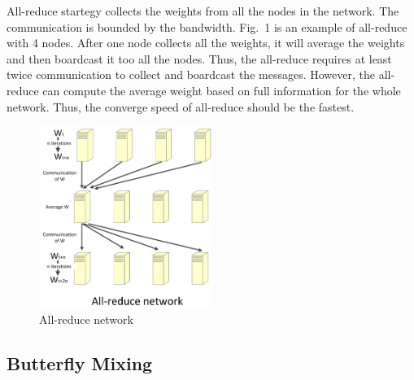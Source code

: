 \documentclass{article}
\begin{document}
All-reduce startegy collects the weights from all the nodes in the network. The communication is bounded by the bandwidth. Fig.~1 is an example of all-reduce with 4 nodes. After one node collects all the weights, it will average the weights and then boardcast it too all the nodes. Thus, the all-reduce requires at least twice communication to collect and boardcast the messages. However, the all-reduce can compute the average weight based on full information for the whole network. Thus, the converge speed of all-reduce should be the fastest.
\begin{figure}[h!]
  
  \centering
    \includegraphics[width=0.5\textwidth]{allreduce.jpg}
    \caption{All-reduce network}
\end{figure}
\subsection{Butterfly Mixing}
 
\end{document}
